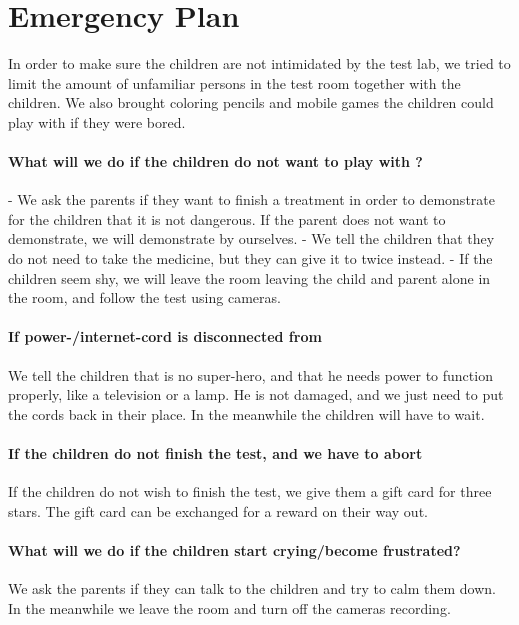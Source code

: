 \section{Emergency Plan}
\label{sec:emergencyplan}
In order to make sure the children are not intimidated by the test lab, we tried to limit the amount of unfamiliar persons in the test room together with the children. We also brought coloring pencils and mobile games the children could play with if they were bored.  

\paragraph{What will we do if the children do not want to play with \ab{}?}
- We ask the parents if they want to finish a treatment in order to demonstrate for the children that it is not dangerous.
If the parent does not want to demonstrate, we will demonstrate by ourselves. 
- We tell the children that they do not need to take the medicine, but they can give it to \ab{} twice instead.
- If the children seem shy, we will leave the room leaving the child and parent alone in the room, and follow the test using cameras. 
 
\paragraph{If power-/internet-cord is disconnected from \ab{}}
We tell the children that \ab{} is no super-hero, and that he needs power to function properly, like a television or a lamp. He is not damaged, and we just need to put the cords back in their place. In the meanwhile the children will have to wait. 


\paragraph{If the children do not finish the test, and we have to abort}
If the children do not wish to finish the test, we give them a gift card for three stars. The gift card can be exchanged for a reward on their way out. 

\paragraph{What will we do if the children start crying/become frustrated?}
We ask the parents if they can talk to the children and try to calm them down. In the meanwhile we leave the room and turn off the cameras recording. 

  
